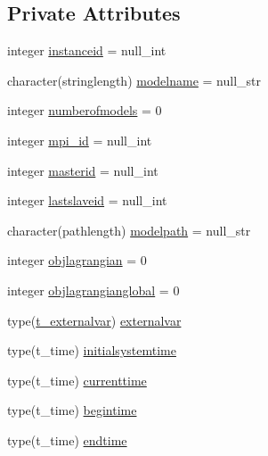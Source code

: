 \subsection*{Private Attributes}
\begin{DoxyCompactItemize}
\item 
integer \mbox{\hyperlink{structmodulemodel_1_1t__model_ad6d22a43d983387940ca22d9880ce69c}{instanceid}} = null\+\_\+int
\item 
character(stringlength) \mbox{\hyperlink{structmodulemodel_1_1t__model_a104eca470fd8a81f5006e385e2b99f87}{modelname}} = null\+\_\+str
\item 
integer \mbox{\hyperlink{structmodulemodel_1_1t__model_a7a636b255bbd22b5feeb053caa3b16c4}{numberofmodels}} = 0
\item 
integer \mbox{\hyperlink{structmodulemodel_1_1t__model_ab68297186bd9e3c23e102f6d4286c552}{mpi\+\_\+id}} = null\+\_\+int
\item 
integer \mbox{\hyperlink{structmodulemodel_1_1t__model_a442d78f3b30f13329969c2eec2c0c72a}{masterid}} = null\+\_\+int
\item 
integer \mbox{\hyperlink{structmodulemodel_1_1t__model_a18cfb692e8554d8d77f136a7f51f06da}{lastslaveid}} = null\+\_\+int
\item 
character(pathlength) \mbox{\hyperlink{structmodulemodel_1_1t__model_a28eccfff4ce13195e73d642fbdbc6f9d}{modelpath}} = null\+\_\+str
\item 
integer \mbox{\hyperlink{structmodulemodel_1_1t__model_ac2bb9a90664c4847c37f38e5f77ce2ef}{objlagrangian}} = 0
\item 
integer \mbox{\hyperlink{structmodulemodel_1_1t__model_ab7d6bbfaef8e48a713ef2cd776b4f703}{objlagrangianglobal}} = 0
\item 
type(\mbox{\hyperlink{structmodulemodel_1_1t__externalvar}{t\+\_\+externalvar}}) \mbox{\hyperlink{structmodulemodel_1_1t__model_ac782ecd9cabec8dd2463b2d7ff0114ce}{externalvar}}
\item 
type(t\+\_\+time) \mbox{\hyperlink{structmodulemodel_1_1t__model_a52faeebea01b4d6105c3c4071d5cfd24}{initialsystemtime}}
\item 
type(t\+\_\+time) \mbox{\hyperlink{structmodulemodel_1_1t__model_a50849fb7dea79490fdf4bab45d1c7d1b}{currenttime}}
\item 
type(t\+\_\+time) \mbox{\hyperlink{structmodulemodel_1_1t__model_a7c04d7ca0dd9c4fe0fbdd0bd4f7e973b}{begintime}}
\item 
type(t\+\_\+time) \mbox{\hyperlink{structmodulemodel_1_1t__model_ac477a7ea662a0d49bd6b48e49e1dd5b7}{endtime}}

\end{DoxyCompactItemize}
